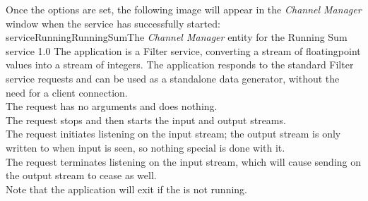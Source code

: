 Once the options are set, the following image will appear in the \emph{Channel Manager}
window when the service has successfully started:
%
{serviceRunningRunningSum}{The \emph{Channel Manager} entity for the Running Sum service}%
{1.0}
The  application is a Filter
service, converting a stream of floating\longDash{}point values into a stream of integers.
The application responds to the standard Filter service requests and can be used as a
standalone data generator, without the need for a client connection.\\

The  request has no arguments and
does nothing.\\

The  request stops and then
starts the input and output streams.\\

The  request initiates listening
on the input stream; the output stream is only written to when input is seen, so nothing
special is done with it.\\

The  request terminates listening
on the input stream, which will cause sending on the output stream to cease as well.\\

Note that the application will exit if the
 is not running.\\

\insertAppParameters
{}
\insertFilterServiceComment\\

